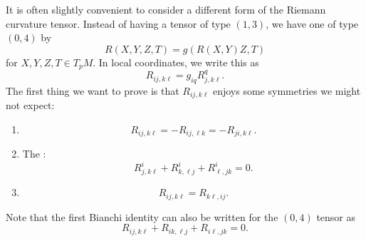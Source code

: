 \documentclass[a4paper]{article}
\begin{document}
It is often slightly convenient to consider a different form of the Riemann curvature tensor. Instead of having a tensor of type $(1, 3)$, we have one of type $(0, 4)$ by
\[
  R(X, Y, Z, T) = g(R(X, Y)Z, T)
\]
for $X, Y, Z, T \in T_p M$. In local coordinates, we write this as
\[
  R_{ij, k\ell} = g_{iq} R^q_{j, k\ell}.
\]
The first thing we want to prove is that $R_{ij, k\ell}$ enjoys some symmetries we might not expect:
\begin{prop}\leavevmode
  \begin{enumerate}
    \item
      \[
        R_{ij, k\ell} = - R_{ij, \ell k} = - R_{ji, k\ell}.
      \]
    \item The :
      \[
        R^i_{j, k \ell} + R^i_{k, \ell j} + R^i_{\ell, jk} = 0.
      \]
    \item
      \[
        R_{ij, k\ell} = R_{k\ell, ij}.
      \]
  \end{enumerate}
\end{prop}
Note that the first Bianchi identity can also be written for the $(0, 4)$ tensor as
\[
  R_{ij, k\ell} + R_{ik, \ell j} + R_{i\ell, jk} = 0.
\]
\end{document}
